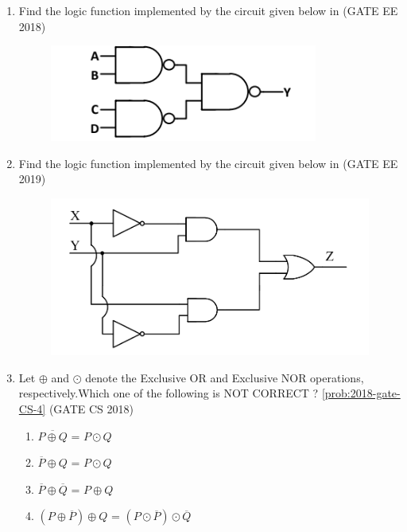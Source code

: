 \begin{enumerate}[label=\arabic*.,ref=\theenumi]
\begin{figure}[H]
\caption{}
\label{fig:2018-gate-ec-31}
\end{figure}
\item 
\label{prob:2018-gate-ee-14}
Find the logic function implemented by the circuit given below 
in 
\hfill (GATE EE 2018)
\begin{figure}[H]
\centering
	\includegraphics[width=0.75\columnwidth]{figs/2018-gate-ee-14.png}
\caption{}
\label{fig:2018-gate-ee-14}
\end{figure}
\item 
\label{prob:2019-gate-ee-36}
Find the logic function implemented by the circuit given below 
in 
\hfill (GATE EE 2019)
\begin{figure}[H]
\centering
	\includegraphics[width=0.75\columnwidth]{figs/2019-gate-ee-36.png}
\caption{}
\label{fig:2019-gate-ee-36}
\end{figure}
\item 
\label{prob:2018-gate-CS-4}		
Let $\oplus$ and $\odot$ denote the Exclusive OR and Exclusive NOR operations, respectively.Which one of the following is NOT CORRECT ?
\ref{prob:2018-gate-CS-4}
\hfill (GATE CS 2018)
\begin{samepage}
\begin{enumerate}[label=(\Alph*)]
    \item $\overline{P\oplus Q}$ = $ P \odot Q $
    \item $\overline{P} \oplus Q$ = $ P \odot Q $
    \item $\overline{P} \oplus \overline{Q}$ = $ P \oplus Q $
    \item $(P \oplus \overline{P}) \oplus Q$ = $(P \odot \overline{P}) \odot \overline{Q}$
\end{enumerate}
\end{samepage}


\end{enumerate}
